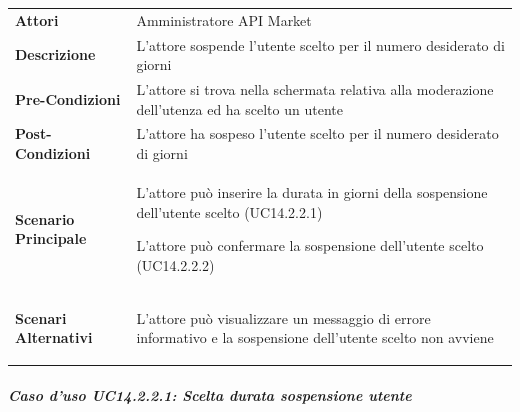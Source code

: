 \begin{minipage}{\linewidth}
	\begin{tabular}{ l | p{11cm}}
		\hline
		\rowcolor{Gray}
		\multicolumn{2}{c}{UC14.2.2 - Sospensione utente} \\
		\hline
		\textbf{Attori} & Amministratore API Market \\
		\textbf{Descrizione} & L'attore sospende l'utente scelto per il numero desiderato di giorni \\
		\textbf{Pre-Condizioni} & L'attore si trova nella schermata relativa alla moderazione dell'utenza ed ha scelto un utente \\
		\textbf{Post-Condizioni} & L'attore ha sospeso l'utente scelto per il numero desiderato di giorni \\
		\textbf{Scenario Principale} & 
		\begin{enumerate*}[label=(\arabic*.),itemjoin={\newline}]
			\item L'attore può inserire la durata in giorni della sospensione dell'utente scelto (UC14.2.2.1)
			\item L'attore può confermare la sospensione dell'utente scelto (UC14.2.2.2)
		\end{enumerate*}\\
		\textbf{Scenari Alternativi} & 
		\begin{enumerate*}[label=(\arabic*.),itemjoin={\newline}]
			\item L'attore può visualizzare un messaggio di errore informativo e la sospensione dell'utente scelto non avviene
		\end{enumerate*}\\
	\end{tabular}
\end{minipage}

\subparagraph{Caso d'uso UC14.2.2.1: Scelta durata sospensione utente}
\label{UC14_2_2_1}


